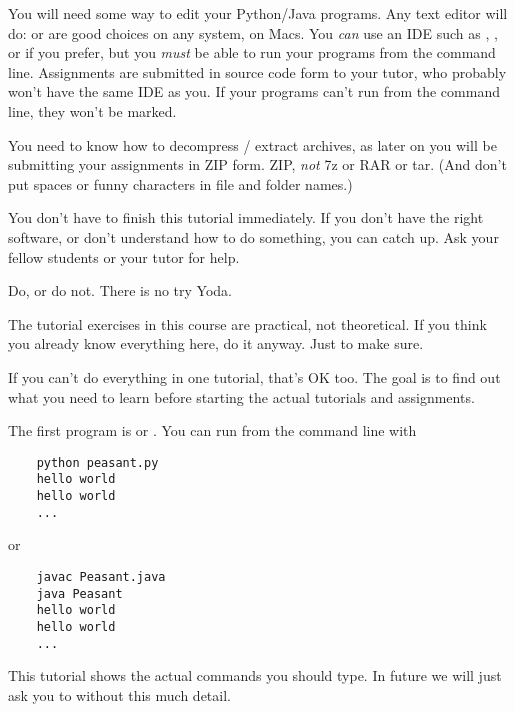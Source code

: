 You will need some way to edit your Python/Java programs. Any text editor will do:
 or  are good choices on any system,  on
Macs. You \emph{can} use an IDE such as , , or 
if you prefer, but you \emph{must} be able to run your programs from the command line.
Assignments are submitted in source code form to your tutor, who probably won't have
the same IDE as you. If your programs can't run from the command line, they won't be
marked.

You need to know how to decompress / extract  archives, as later on you will
be submitting your assignments in ZIP form. ZIP, \emph{not} 7z or RAR or tar.
(And don't put spaces or funny characters in file and folder names.)

You don't have to finish this tutorial immediately. If you don't have the right
software, or don't understand how to do something, you can catch up. Ask your fellow
students or your tutor for help.



\begin{IMPORTANT}
Do, or do not. There is no try \DSH Yoda.

The tutorial exercises in this course are practical, not theoretical. If you think
you already know everything here, do it anyway. Just to make sure.

If you can't do everything in one tutorial, that's OK too. The goal is to find
out what you need to learn before starting the actual tutorials and assignments.
\end{IMPORTANT}

The first program is  or . You can run from the
command line with
\begin{CODE}\begin{verbatim}
    python peasant.py
    hello world
    hello world
    ...
\end{verbatim}\end{CODE}
or
\begin{CODE}\begin{verbatim}
    javac Peasant.java
    java Peasant
    hello world
    hello world
    ...
\end{verbatim}\end{CODE}

\begin{IMPORTANT}
This tutorial shows the actual commands you should type. In future we will just ask you
to  without this much detail.
\end{IMPORTANT}

